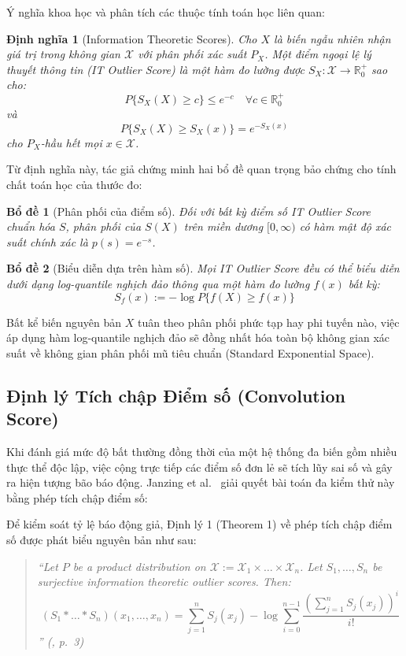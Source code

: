 \documentclass[11pt,a4paper]{article}
\newtheorem{definition}{Định nghĩa}
\newtheorem{lemma}{Bổ đề}
\begin{document}
Ý nghĩa khoa học và phân tích các thuộc tính toán học liên quan:
\begin{definition}[Information Theoretic Scores]
Cho $X$ là biến ngẫu nhiên nhận giá trị trong không gian $\mathcal{X}$ với phân phối xác suất $P_X$. Một điểm ngoại lệ lý thuyết thông tin (IT Outlier Score) là một hàm đo lường được $S_X : \mathcal{X} \to \mathbb{R}^+_0$ sao cho:
\begin{equation}
P\{S_X(X) \ge c\} \le e^{-c} \quad \forall c \in \mathbb{R}^+_0
\end{equation}
và
\begin{equation}
P\{S_X(X) \ge S_X(x)\} = e^{-S_X(x)}
\end{equation}
cho $P_X$-hầu hết mọi $x \in \mathcal{X}$.
\end{definition}

Từ định nghĩa này, tác giả chứng minh hai bổ đề quan trọng bảo chứng cho tính chất toán học của thước đo:
\begin{lemma}[Phân phối của điểm số]
Đối với bất kỳ điểm số IT Outlier Score chuẩn hóa $S$, phân phối của $S(X)$ trên miền dương $[0, \infty)$ có hàm mật độ xác suất chính xác là $p(s) = e^{-s}$.
\end{lemma}

\begin{lemma}[Biểu diễn dựa trên hàm số]
Mọi IT Outlier Score đều có thể biểu diễn dưới dạng log-quantile nghịch đảo thông qua một hàm đo lường $f(x)$ bất kỳ:
\begin{equation}
S_f(x) := -\log P\{f(X) \ge f(x)\}
\end{equation}
\end{lemma}

Bất kể biến nguyên bản $X$ tuân theo phân phối phức tạp hay phi tuyến nào, việc áp dụng hàm log-quantile nghịch đảo sẽ đồng nhất hóa toàn bộ không gian xác suất về không gian phân phối mũ tiêu chuẩn (Standard Exponential Space).

\subsection{Định lý Tích chập Điểm số (Convolution Score)}

Khi đánh giá mức độ bất thường đồng thời của một hệ thống đa biến gồm nhiều thực thể độc lập, việc cộng trực tiếp các điểm số đơn lẻ sẽ tích lũy sai số và gây ra hiện tượng bão báo động. Janzing et al.~\cite{janzing2019rootcause} giải quyết bài toán đa kiểm thử này bằng phép tích chập điểm số:

Để kiểm soát tỷ lệ báo động giả, Định lý 1 (Theorem 1) về phép tích chập điểm số được phát biểu nguyên bản như sau:
\begin{quote}
\itshape
``Let $P$ be a product distribution on $\mathcal{X} := \mathcal{X}_1 \times \dots \times \mathcal{X}_n$. Let $S_1, \dots, S_n$ be surjective information theoretic outlier scores. Then:
\begin{equation*}
(S_1 * \dots * S_n)(x_1, \dots, x_n) = \sum_{j=1}^n S_j(x_j) - \log \sum_{i=0}^{n-1} \frac{\left(\sum_{j=1}^n S_j(x_j)\right)^i}{i!}
\end{equation*}'' (\cite{janzing2019rootcause}, p.~3)
\end{quote}
\end{document}

